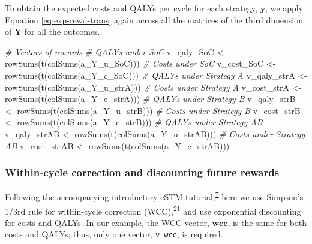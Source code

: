 \documentclass[
]{article}
\newenvironment{Shaded}{\begin{snugshade}}{\end{snugshade}}
\newcommand{\CommentTok}[1]{\textcolor[rgb]{0.56,0.35,0.01}{\textit{#1}}}
\newcommand{\FunctionTok}[1]{\textcolor[rgb]{0.00,0.00,0.00}{#1}}
\newcommand{\NormalTok}[1]{#1}
\newcommand{\OtherTok}[1]{\textcolor[rgb]{0.56,0.35,0.01}{#1}}
\begin{document}
To obtain the expected costs and QALYs per cycle for each strategy, \(\mathbf{y}\), we apply Equation \eqref{eq:exp-rewd-trans} again across all the matrices of the third dimension of \(\mathbf{Y}\) for all the outcomes.

\begin{Shaded}
\begin{Highlighting}[]
\CommentTok{\# Vectors of rewards}
\CommentTok{\# QALYs under SoC}
\NormalTok{v\_qaly\_SoC }\OtherTok{\textless{}{-}} \FunctionTok{rowSums}\NormalTok{(}\FunctionTok{t}\NormalTok{(}\FunctionTok{colSums}\NormalTok{(a\_Y\_u\_SoC)))}
\CommentTok{\# Costs under SoC}
\NormalTok{v\_cost\_SoC }\OtherTok{\textless{}{-}} \FunctionTok{rowSums}\NormalTok{(}\FunctionTok{t}\NormalTok{(}\FunctionTok{colSums}\NormalTok{(a\_Y\_c\_SoC)))}
\CommentTok{\# QALYs under Strategy A}
\NormalTok{v\_qaly\_strA }\OtherTok{\textless{}{-}} \FunctionTok{rowSums}\NormalTok{(}\FunctionTok{t}\NormalTok{(}\FunctionTok{colSums}\NormalTok{(a\_Y\_u\_strA)))}
\CommentTok{\# Costs under Strategy A}
\NormalTok{v\_cost\_strA }\OtherTok{\textless{}{-}} \FunctionTok{rowSums}\NormalTok{(}\FunctionTok{t}\NormalTok{(}\FunctionTok{colSums}\NormalTok{(a\_Y\_c\_strA)))}
\CommentTok{\# QALYs under Strategy B}
\NormalTok{v\_qaly\_strB }\OtherTok{\textless{}{-}} \FunctionTok{rowSums}\NormalTok{(}\FunctionTok{t}\NormalTok{(}\FunctionTok{colSums}\NormalTok{(a\_Y\_u\_strB)))}
\CommentTok{\# Costs under Strategy B}
\NormalTok{v\_cost\_strB }\OtherTok{\textless{}{-}} \FunctionTok{rowSums}\NormalTok{(}\FunctionTok{t}\NormalTok{(}\FunctionTok{colSums}\NormalTok{(a\_Y\_c\_strB)))}
\CommentTok{\# QALYs under Strategy AB}
\NormalTok{v\_qaly\_strAB }\OtherTok{\textless{}{-}} \FunctionTok{rowSums}\NormalTok{(}\FunctionTok{t}\NormalTok{(}\FunctionTok{colSums}\NormalTok{(a\_Y\_u\_strAB)))}
\CommentTok{\# Costs under Strategy AB}
\NormalTok{v\_cost\_strAB }\OtherTok{\textless{}{-}} \FunctionTok{rowSums}\NormalTok{(}\FunctionTok{t}\NormalTok{(}\FunctionTok{colSums}\NormalTok{(a\_Y\_c\_strAB)))}
\end{Highlighting}
\end{Shaded}

\hypertarget{within-cycle-correction-and-discounting-future-rewards}{%
\subsubsection{Within-cycle correction and discounting future rewards}\label{within-cycle-correction-and-discounting-future-rewards}}

Following the accompanying introductory cSTM tutorial,\textsuperscript{\protect\hyperlink{ref-Alarid-Escudero2021a}{7}} here we use Simpson's 1/3rd rule for within-cycle correction (WCC),\textsuperscript{\protect\hyperlink{ref-Elbasha2016a}{21}} and use exponential discounting for costs and QALYs. In our example, the WCC vector, \(\mathbf{wcc}\), is the same for both costs and QALYs; thus, only one vector, \texttt{v\_wcc}, is required.
\end{document}
